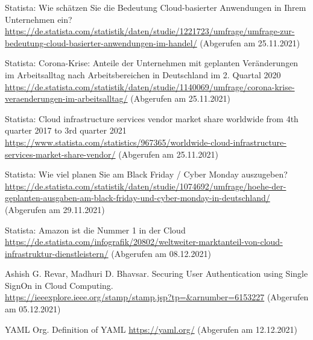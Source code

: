 \begin{thebibliography}{HR08}
    Statista: Wie schätzen Sie die Bedeutung Cloud-basierter Anwendungen in Ihrem Unternehmen ein?\\
 \url{https://de.statista.com/statistik/daten/studie/1221723/umfrage/umfrage-zur-bedeutung-cloud-basierter-anwendungen-im-handel/}
 (Abgerufen am 25.11.2021) 
  
    Statista: Corona-Krise: Anteile der Unternehmen mit geplanten Veränderungen im Arbeitsalltag nach Arbeitsbereichen in Deutschland im 2. Quartal 2020\\
 \url{https://de.statista.com/statistik/daten/studie/1140069/umfrage/corona-krise-veraenderungen-im-arbeitsalltag/}
 (Abgerufen am 25.11.2021) 
   
   Statista: Cloud infrastructure services vendor market share worldwide from 4th quarter 2017 to 3rd quarter 2021\\
 \url{https://www.statista.com/statistics/967365/worldwide-cloud-infrastructure-services-market-share-vendor/}
 (Abgerufen am 25.11.2021) 
  
  Statista: Wie viel planen Sie am Black Friday / Cyber Monday auszugeben? \\
 \url{https://de.statista.com/statistik/daten/studie/1074692/umfrage/hoehe-der-geplanten-ausgaben-am-black-friday-und-cyber-monday-in-deutschland/}
 (Abgerufen am 29.11.2021) 

  Statista: Amazon ist die Nummer 1 in der Cloud \\
 \url{https://de.statista.com/infografik/20802/weltweiter-marktanteil-von-cloud-infrastruktur-dienstleistern/}
 (Abgerufen am 08.12.2021) 

Ashish G. Revar, Madhuri D. Bhavsar. Securing User Authentication using Single SignOn in Cloud Computing.\\
 \url{https://ieeexplore.ieee.org/stamp/stamp.jsp?tp=&arnumber=6153227}
 (Abgerufen am 05.12.2021) 

YAML Org. Definition of YAML \url{https://yaml.org/}
 (Abgerufen am 12.12.2021)
\end{thebibliography}


